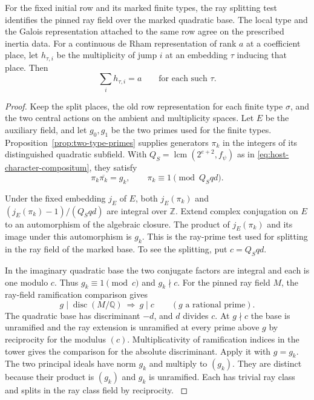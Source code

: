 \begin{proposition}\label{prop:initial-row-arithmetic-readings}
For the fixed initial row and its marked finite types, the ray
splitting test identifies the pinned ray field over the marked
quadratic base. The local type and the Galois representation attached to the same
row agree on the prescribed inertia data. For a continuous de Rham representation of rank \(a\) at a coefficient place, let \(h_{\tau,i}\) be the multiplicity of jump \(i\) at an embedding \(\tau\) inducing that place. Then
\[
 \sum_i h_{\tau,i}=a\qquad\text{for each such }\tau.
\]
\end{proposition}

\begin{proof}
Keep the split places, the old row representation for each
finite type \(\sigma\), and the two central actions on the
ambient and multiplicity spaces. Let \(E\) be the auxiliary field,
and let \(g_0,g_1\) be the two primes used for the finite
types. Proposition~\ref{prop:two-type-primes} supplies generators
\(\pi_k\) in the integers of its distinguished quadratic subfield.
With \(Q_S=\operatorname{lcm}(2^{e+2},f_\psi)\) as in
\eqref{eq:host-character-compositum}, they satisfy
\[
   \pi_k\overline{\pi_k}=g_k,
   \qquad \pi_k\equiv 1\pmod{Q_Sqd}.
\]

Under the fixed embedding \(j_E\) of \(E\), both
\(j_E(\pi_k)\) and \((j_E(\pi_k)-1)/(Q_Sqd)\)
are integral over \(\mathbb Z\). Extend complex conjugation on \(E\) to an automorphism of the algebraic closure. The
product of \(j_E(\pi_k)\) and its image under this
automorphism is \(g_k\). This is the ray-prime test used
for splitting in the ray field of the marked base. To
see the splitting, put \(c=Q_Sqd\).

In the imaginary
quadratic base the two conjugate factors are integral
and each is one modulo \(c\). Thus \(g_k\equiv1\pmod c\)
and \(g_k\nmid c\). For the pinned ray field \(M\), the
ray-field ramification comparison gives
\[
              g\mid\operatorname{disc}(M/\mathbb Q)
                  \ \Longrightarrow\ g\mid c
              \qquad(g\text{ a rational prime}).
\]
The quadratic base has discriminant \(-d\), and \(d\)
divides \(c\). At \(g\nmid c\) the base is unramified and
the ray extension is unramified at every prime above \(g\)
by reciprocity for the modulus \((c)\). Multiplicativity of
ramification indices in the tower gives the comparison for
the absolute discriminant. Apply it with \(g=g_k\).
The two principal ideals have
norm \(g_k\) and multiply to \((g_k)\). They are distinct
because their product is \((g_k)\) and \(g_k\) is unramified.
Each has trivial ray class
and splits in the ray class field by reciprocity.
\label{cor:automorphic-realization-15}


\end{proof}
